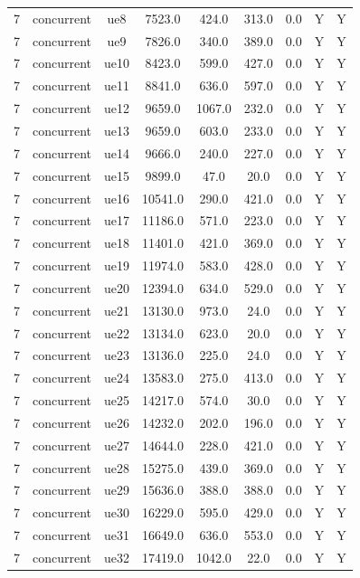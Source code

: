 \begin{table}[ht]
\begin{tabular}{|c|c|c|c|c|c|c|c|c|}
7 & concurrent & ue8 & 7523.0 & 424.0 & 313.0 & 0.0 & Y & Y \\
7 & concurrent & ue9 & 7826.0 & 340.0 & 389.0 & 0.0 & Y & Y \\
7 & concurrent & ue10 & 8423.0 & 599.0 & 427.0 & 0.0 & Y & Y \\
7 & concurrent & ue11 & 8841.0 & 636.0 & 597.0 & 0.0 & Y & Y \\
7 & concurrent & ue12 & 9659.0 & 1067.0 & 232.0 & 0.0 & Y & Y \\
7 & concurrent & ue13 & 9659.0 & 603.0 & 233.0 & 0.0 & Y & Y \\
7 & concurrent & ue14 & 9666.0 & 240.0 & 227.0 & 0.0 & Y & Y \\
7 & concurrent & ue15 & 9899.0 & 47.0 & 20.0 & 0.0 & Y & Y \\
7 & concurrent & ue16 & 10541.0 & 290.0 & 421.0 & 0.0 & Y & Y \\
7 & concurrent & ue17 & 11186.0 & 571.0 & 223.0 & 0.0 & Y & Y \\
7 & concurrent & ue18 & 11401.0 & 421.0 & 369.0 & 0.0 & Y & Y \\
7 & concurrent & ue19 & 11974.0 & 583.0 & 428.0 & 0.0 & Y & Y \\
7 & concurrent & ue20 & 12394.0 & 634.0 & 529.0 & 0.0 & Y & Y \\
7 & concurrent & ue21 & 13130.0 & 973.0 & 24.0 & 0.0 & Y & Y \\
7 & concurrent & ue22 & 13134.0 & 623.0 & 20.0 & 0.0 & Y & Y \\
7 & concurrent & ue23 & 13136.0 & 225.0 & 24.0 & 0.0 & Y & Y \\
7 & concurrent & ue24 & 13583.0 & 275.0 & 413.0 & 0.0 & Y & Y \\
7 & concurrent & ue25 & 14217.0 & 574.0 & 30.0 & 0.0 & Y & Y \\
7 & concurrent & ue26 & 14232.0 & 202.0 & 196.0 & 0.0 & Y & Y \\
7 & concurrent & ue27 & 14644.0 & 228.0 & 421.0 & 0.0 & Y & Y \\
7 & concurrent & ue28 & 15275.0 & 439.0 & 369.0 & 0.0 & Y & Y \\
7 & concurrent & ue29 & 15636.0 & 388.0 & 388.0 & 0.0 & Y & Y \\
7 & concurrent & ue30 & 16229.0 & 595.0 & 429.0 & 0.0 & Y & Y \\
7 & concurrent & ue31 & 16649.0 & 636.0 & 553.0 & 0.0 & Y & Y \\
7 & concurrent & ue32 & 17419.0 & 1042.0 & 22.0 & 0.0 & Y & Y \\

\end{tabular}
\end{table}
